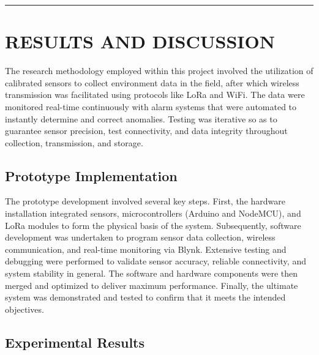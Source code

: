 \documentclass[conference, onecolumn]{IEEEtran}
\begin{document}
\vspace{10pt}
\noindent\rule{\textwidth}{0.4pt}
\vspace{10pt}

\section{RESULTS AND DISCUSSION}
The research methodology employed within this project involved the utilization of calibrated sensors to collect environment data in the field, after which wireless transmission was facilitated using protocols like LoRa and WiFi. The data were monitored real-time continuously with alarm systems that were automated to instantly determine and correct anomalies. Testing was iterative so as to guarantee sensor precision, test connectivity, and data integrity throughout collection, transmission, and storage.

\subsection{Prototype Implementation}
The prototype development involved several key steps. First, the hardware installation integrated sensors, microcontrollers (Arduino and NodeMCU), and LoRa modules to form the physical basis of the system. Subsequently, software development was undertaken to program sensor data collection, wireless communication, and real-time monitoring via Blynk. Extensive testing and debugging were performed to validate sensor accuracy, reliable connectivity, and system stability in general. The software and hardware components were then merged and optimized to deliver maximum performance. Finally, the ultimate system was demonstrated and tested to confirm that it meets the intended objectives.

\subsection{Experimental Results}
\end{document}
